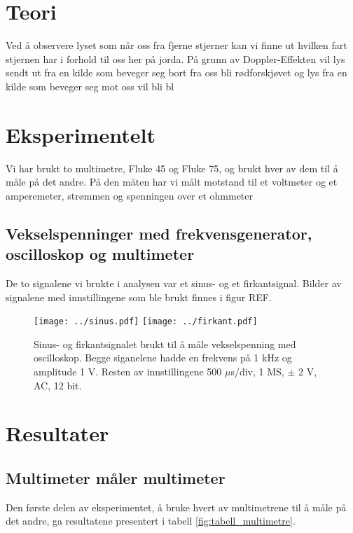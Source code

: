 \documentclass[reprint, english,notitlepage]{revtex4-1}  %
\begin{document}
\section{Teori}

Ved å observere lyset som når oss fra fjerne stjerner kan vi finne ut hvilken fart stjernen har i
 forhold til oss her på jorda. På grunn av Doppler-Effekten vil lys sendt ut fra en kilde som
 beveger seg bort fra oss bli rødforskjøvet og lys fra en kilde som beveger seg mot oss vil bli
 bl



\section{Eksperimentelt}

Vi har brukt to multimetre, Fluke 45 og Fluke 75, og brukt hver av dem til å måle på det andre. På den måten har vi målt motstand til et voltmeter og et amperemeter, strømmen og spenningen over et ohmmeter


\subsection{Vekselspenninger med frekvensgenerator, oscilloskop og multimeter}
De to signalene vi brukte i analysen var et sinus- og et firkantsignal. Bilder av signalene med innstillingene som ble brukt finnes i figur REF.

\begin{figure}
  \texttt{[image: ../sinus.pdf]}
  \texttt{[image: ../firkant.pdf]}
  \caption{Sinus- og firkantsignalet brukt til å måle vekselspenning med oscilloskop. Begge siganelene hadde en frekvens på 1 kHz og amplitude 1 V. Resten av innstillingene 500 $\mu$s/div, 1 MS, $\pm$ 2 V, AC, 12 bit.}
  \label{fig:sinussignal}
\end{figure}


\section{Resultater}

\subsection{Multimeter måler multimeter}
Den første delen av eksperimentet, å bruke hvert av multimetrene til å måle på det andre, ga resultatene presentert i tabell \ref{fig:tabell_multimetre}.
\end{document}
